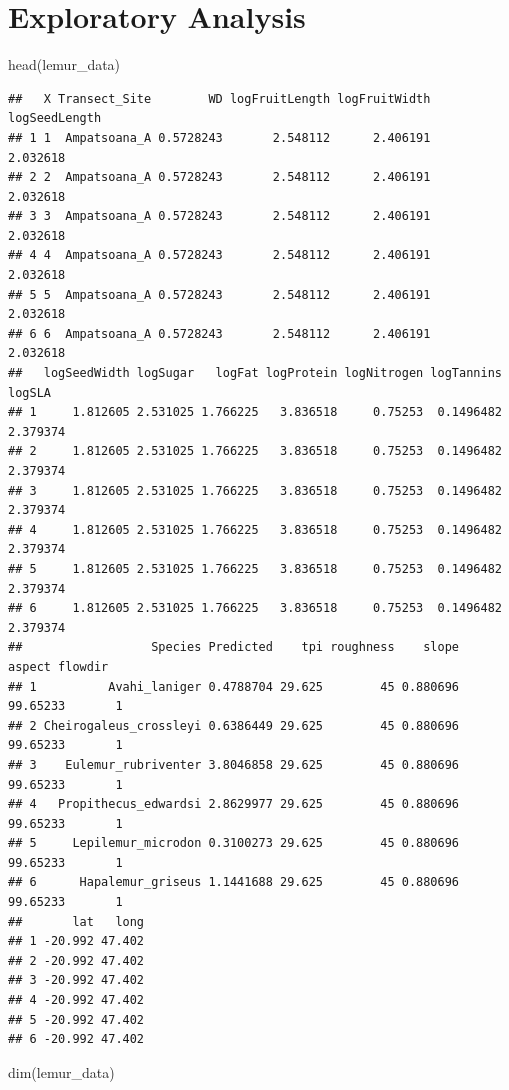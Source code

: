 \documentclass[
  12pt,
]{article}
\newenvironment{Shaded}{\begin{snugshade}}{\end{snugshade}}
\newcommand{\FunctionTok}[1]{\textcolor[rgb]{0.00,0.00,0.00}{#1}}
\newcommand{\NormalTok}[1]{#1}
\begin{document}
\newpage

\hypertarget{exploratory-analysis}{%
\section{Exploratory Analysis}\label{exploratory-analysis}}

\begin{Shaded}
\begin{Highlighting}[]
\FunctionTok{head}\NormalTok{(lemur\_data)}
\end{Highlighting}
\end{Shaded}

\begin{verbatim}
##   X Transect_Site        WD logFruitLength logFruitWidth logSeedLength
## 1 1  Ampatsoana_A 0.5728243       2.548112      2.406191      2.032618
## 2 2  Ampatsoana_A 0.5728243       2.548112      2.406191      2.032618
## 3 3  Ampatsoana_A 0.5728243       2.548112      2.406191      2.032618
## 4 4  Ampatsoana_A 0.5728243       2.548112      2.406191      2.032618
## 5 5  Ampatsoana_A 0.5728243       2.548112      2.406191      2.032618
## 6 6  Ampatsoana_A 0.5728243       2.548112      2.406191      2.032618
##   logSeedWidth logSugar   logFat logProtein logNitrogen logTannins   logSLA
## 1     1.812605 2.531025 1.766225   3.836518     0.75253  0.1496482 2.379374
## 2     1.812605 2.531025 1.766225   3.836518     0.75253  0.1496482 2.379374
## 3     1.812605 2.531025 1.766225   3.836518     0.75253  0.1496482 2.379374
## 4     1.812605 2.531025 1.766225   3.836518     0.75253  0.1496482 2.379374
## 5     1.812605 2.531025 1.766225   3.836518     0.75253  0.1496482 2.379374
## 6     1.812605 2.531025 1.766225   3.836518     0.75253  0.1496482 2.379374
##                  Species Predicted    tpi roughness    slope   aspect flowdir
## 1          Avahi_laniger 0.4788704 29.625        45 0.880696 99.65233       1
## 2 Cheirogaleus_crossleyi 0.6386449 29.625        45 0.880696 99.65233       1
## 3    Eulemur_rubriventer 3.8046858 29.625        45 0.880696 99.65233       1
## 4   Propithecus_edwardsi 2.8629977 29.625        45 0.880696 99.65233       1
## 5     Lepilemur_microdon 0.3100273 29.625        45 0.880696 99.65233       1
## 6      Hapalemur_griseus 1.1441688 29.625        45 0.880696 99.65233       1
##       lat   long
## 1 -20.992 47.402
## 2 -20.992 47.402
## 3 -20.992 47.402
## 4 -20.992 47.402
## 5 -20.992 47.402
## 6 -20.992 47.402
\end{verbatim}

\begin{Shaded}
\begin{Highlighting}[]
\FunctionTok{dim}\NormalTok{(lemur\_data)}
\end{Highlighting}
\end{Shaded}
\end{document}
